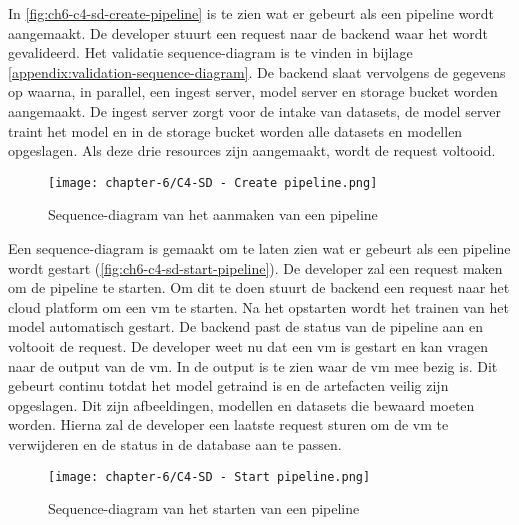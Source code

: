 In \autoref{fig:ch6-c4-sd-create-pipeline} is te zien wat er gebeurt als een pipeline wordt aangemaakt. De developer stuurt een request naar de backend waar het wordt gevalideerd. Het validatie sequence-diagram is te vinden in bijlage \ref{appendix:validation-sequence-diagram}. De backend slaat vervolgens de gegevens op waarna, in parallel, een ingest server, model server en storage bucket worden aangemaakt. De ingest server zorgt voor de intake van datasets, de model server traint het model en in de storage bucket worden alle datasets en modellen opgeslagen. Als deze drie resources zijn aangemaakt, wordt de request voltooid.

\begin{figure}[hbt!]
  \centering
  \texttt{[image: chapter-6/C4-SD - Create pipeline.png]}
  \caption{Sequence-diagram van het aanmaken van een pipeline}
  \label{fig:ch6-c4-sd-create-pipeline}
\end{figure}

Een sequence-diagram is gemaakt om te laten zien wat er gebeurt als een pipeline wordt gestart (\autoref{fig:ch6-c4-sd-start-pipeline}). De developer zal een request maken om de pipeline te starten. Om dit te doen stuurt de backend een request naar het cloud platform om een \acrfull{vm} te starten. Na het opstarten wordt het trainen van het model automatisch gestart. De backend past de status van de pipeline aan en voltooit de request. De developer weet nu dat een \acrshort{vm} is gestart en kan vragen naar de output van de \acrshort{vm}. In de output is te zien waar de \acrshort{vm} mee bezig is. Dit gebeurt continu totdat het model getraind is en de artefacten veilig zijn opgeslagen. Dit zijn afbeeldingen, modellen en datasets die bewaard moeten worden. Hierna zal de developer een laatste request sturen om de \acrshort{vm} te verwijderen en de status in de database aan te passen.

\clearpage

\begin{figure}[hbt!]
  \centering
  \texttt{[image: chapter-6/C4-SD - Start pipeline.png]}
  \caption{Sequence-diagram van het starten van een pipeline}
  \label{fig:ch6-c4-sd-start-pipeline}
\end{figure}

